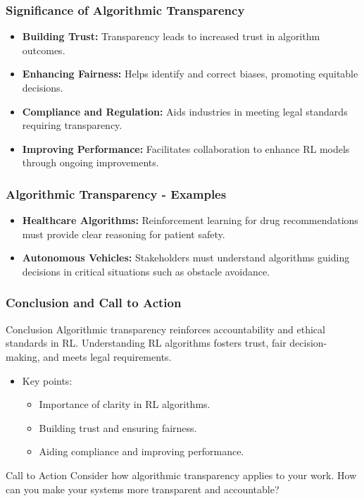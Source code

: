 \documentclass[aspectratio=169]{beamer}
\begin{document}
\begin{frame}[fragile]
    \frametitle{Significance of Algorithmic Transparency}
    \begin{itemize}
        \item \textbf{Building Trust:} Transparency leads to increased trust in algorithm outcomes.
        \item \textbf{Enhancing Fairness:} Helps identify and correct biases, promoting equitable decisions.
        \item \textbf{Compliance and Regulation:} Aids industries in meeting legal standards requiring transparency.
        \item \textbf{Improving Performance:} Facilitates collaboration to enhance RL models through ongoing improvements.
    \end{itemize}
\end{frame}

\begin{frame}[fragile]
    \frametitle{Algorithmic Transparency - Examples}
    \begin{itemize}
        \item \textbf{Healthcare Algorithms:} Reinforcement learning for drug recommendations must provide clear reasoning for patient safety.
        \item \textbf{Autonomous Vehicles:} Stakeholders must understand algorithms guiding decisions in critical situations such as obstacle avoidance.
    \end{itemize}
\end{frame}

\begin{frame}[fragile]
    \frametitle{Conclusion and Call to Action}
    \begin{block}{Conclusion}
        Algorithmic transparency reinforces accountability and ethical standards in RL. Understanding RL algorithms fosters trust, fair decision-making, and meets legal requirements.
    \end{block}
    \begin{itemize}
        \item Key points:
        \begin{itemize}
            \item Importance of clarity in RL algorithms.
            \item Building trust and ensuring fairness.
            \item Aiding compliance and improving performance.
        \end{itemize}
    \end{itemize}
    \begin{block}{Call to Action}
        Consider how algorithmic transparency applies to your work. How can you make your systems more transparent and accountable?
    \end{block}
\end{frame}
\end{document}
